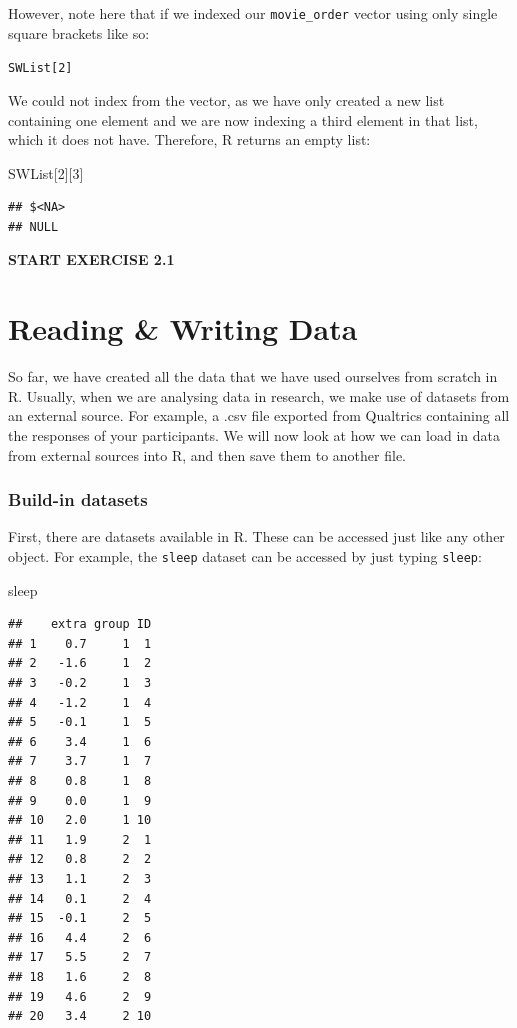 \documentclass[
]{book}
\newenvironment{Shaded}{\begin{snugshade}}{\end{snugshade}}
\newcommand{\DecValTok}[1]{\textcolor[rgb]{0.00,0.00,0.81}{#1}}
\newcommand{\NormalTok}[1]{#1}
\begin{document}
However, note here that if we indexed our \texttt{movie\_order} vector using only single square brackets like so:

\texttt{SWList{[}2{]}}

We could not index from the vector, as we have only created a new list containing one element and we are now indexing a third element in that list, which it does not have. Therefore, R returns an empty list:

\begin{Shaded}
\begin{Highlighting}[]
\NormalTok{SWList[}\DecValTok{2}\NormalTok{][}\DecValTok{3}\NormalTok{]}
\end{Highlighting}
\end{Shaded}

\begin{verbatim}
## $<NA>
## NULL
\end{verbatim}

\textbf{START EXERCISE 2.1}

\section{Reading \& Writing Data}\label{reading-writing-data}

So far, we have created all the data that we have used ourselves from scratch in R. Usually, when we are analysing data in research, we make use of datasets from an external source. For example, a .csv file exported from Qualtrics containing all the responses of your participants. We will now look at how we can load in data from external sources into R, and then save them to another file.

\subsubsection{Build-in datasets}\label{build-in-datasets}

First, there are datasets available in R. These can be accessed just like any other object. For example, the \texttt{sleep} dataset can be accessed by just typing \texttt{sleep}:

\begin{Shaded}
\begin{Highlighting}[]
\NormalTok{sleep}
\end{Highlighting}
\end{Shaded}

\begin{verbatim}
##    extra group ID
## 1    0.7     1  1
## 2   -1.6     1  2
## 3   -0.2     1  3
## 4   -1.2     1  4
## 5   -0.1     1  5
## 6    3.4     1  6
## 7    3.7     1  7
## 8    0.8     1  8
## 9    0.0     1  9
## 10   2.0     1 10
## 11   1.9     2  1
## 12   0.8     2  2
## 13   1.1     2  3
## 14   0.1     2  4
## 15  -0.1     2  5
## 16   4.4     2  6
## 17   5.5     2  7
## 18   1.6     2  8
## 19   4.6     2  9
## 20   3.4     2 10
\end{verbatim}
\end{document}
